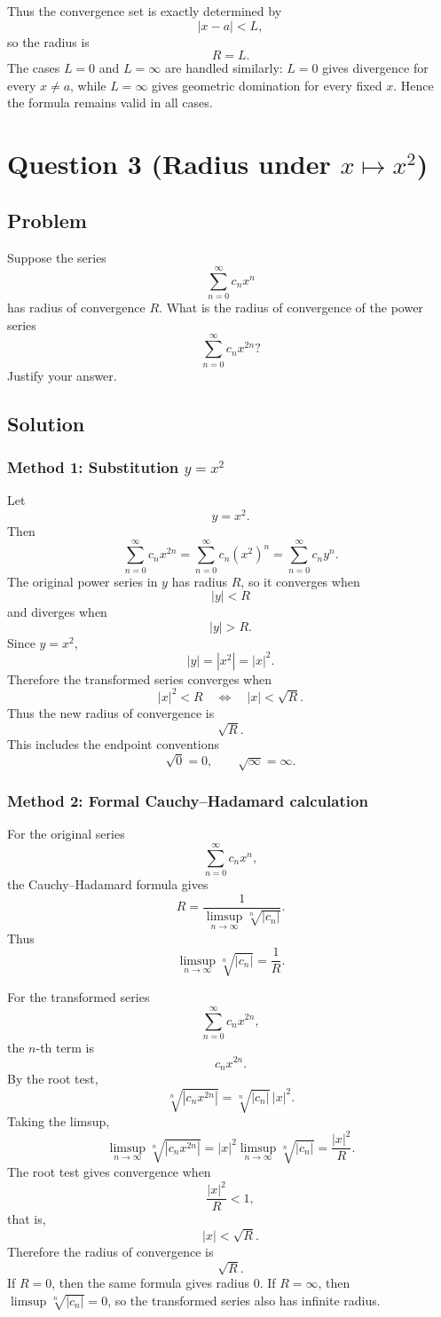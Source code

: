 \documentclass[12pt]{article}
\begin{document}
Thus the convergence set is exactly determined by
\[
|x-a|<L,
\]
so the radius is
\[
\boxed{R=L}.
\]
The cases \(L=0\) and \(L=\infty\) are handled similarly: \(L=0\) gives divergence for every \(x\ne a\), while \(L=\infty\) gives geometric domination for every fixed \(x\). Hence the formula remains valid in all cases.

\newpage
\section*{Question 3 (Radius under \(x\mapsto x^2\))}
\subsection*{Problem}
Suppose the series
\[
\sum_{n=0}^{\infty}c_nx^n
\]
has radius of convergence \(R\). What is the radius of convergence of the power series
\[
\sum_{n=0}^{\infty}c_nx^{2n}?
\]
Justify your answer.

\subsection*{Solution}

\subsubsection*{Method 1: Substitution \(y=x^2\)}
Let
\[
y=x^2.
\]
Then
\[
\sum_{n=0}^{\infty}c_nx^{2n}
=
\sum_{n=0}^{\infty}c_n(x^2)^n
=
\sum_{n=0}^{\infty}c_ny^n.
\]
The original power series in \(y\) has radius \(R\), so it converges when
\[
|y|<R
\]
and diverges when
\[
|y|>R.
\]
Since \(y=x^2\),
\[
|y|=|x^2|=|x|^2.
\]
Therefore the transformed series converges when
\[
|x|^2<R
\quad\Longleftrightarrow\quad
|x|<\sqrt R.
\]
Thus the new radius of convergence is
\[
\boxed{\sqrt R}.
\]
This includes the endpoint conventions
\[
\sqrt0=0,\qquad \sqrt{\infty}=\infty.
\]

\subsubsection*{Method 2: Formal Cauchy--Hadamard calculation}
For the original series
\[
\sum_{n=0}^{\infty}c_nx^n,
\]
the Cauchy--Hadamard formula gives
\[
R=\frac1{\limsup\limits_{n\to\infty}\sqrt[n]{|c_n|}}.
\]
Thus
\[
\limsup_{n\to\infty}\sqrt[n]{|c_n|}
=
\frac1R.
\]

For the transformed series
\[
\sum_{n=0}^{\infty}c_nx^{2n},
\]
the \(n\)-th term is
\[
c_nx^{2n}.
\]
By the root test,
\[
\sqrt[n]{|c_nx^{2n}|}
=
\sqrt[n]{|c_n|}\,|x|^2.
\]
Taking the limsup,
\[
\limsup_{n\to\infty}\sqrt[n]{|c_nx^{2n}|}
=
|x|^2\limsup_{n\to\infty}\sqrt[n]{|c_n|}
=
\frac{|x|^2}{R}.
\]
The root test gives convergence when
\[
\frac{|x|^2}{R}<1,
\]
that is,
\[
|x|<\sqrt R.
\]
Therefore the radius of convergence is
\[
\boxed{\sqrt R}.
\]
If \(R=0\), then the same formula gives radius \(0\). If \(R=\infty\), then \(\limsup\sqrt[n]{|c_n|}=0\), so the transformed series also has infinite radius.
\end{document}
